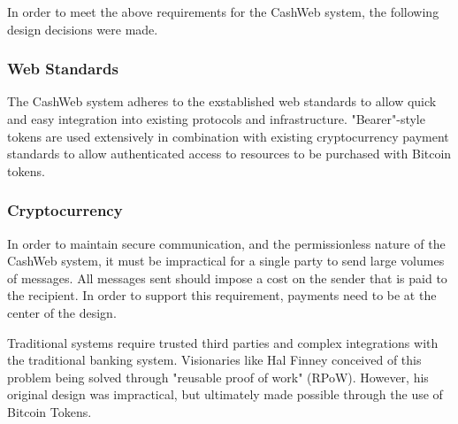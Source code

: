 \documentclass{article}
\begin{document}
In order to meet the above requirements for the CashWeb system, the following design decisions were made.

\subsubsection{Web Standards}

The CashWeb system adheres to the exstablished web standards to allow quick and easy integration into existing protocols and infrastructure. "Bearer"-style tokens are used extensively in combination with existing cryptocurrency payment standards to allow authenticated access to resources to be purchased with Bitcoin tokens.


\subsubsection{Cryptocurrency}

In order to maintain secure communication, and the permissionless nature of the CashWeb system, it must be impractical for a single party to send large volumes of messages. All messages sent should impose a cost on the sender that is paid to the recipient. In order to support this requirement, payments need to be at the center of the design.

Traditional systems require trusted third parties and complex integrations with the traditional banking system. Visionaries like Hal Finney conceived of this problem being solved through "reusable proof of work" (RPoW). However, his original design was impractical, but ultimately made possible through the use of Bitcoin Tokens.
\end{document}
